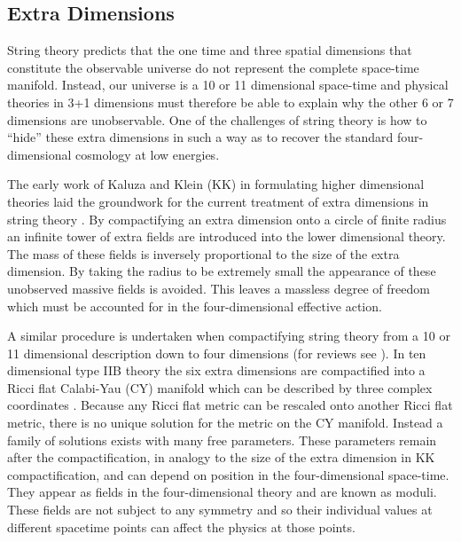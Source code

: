\subsection{Extra Dimensions}
String theory predicts that the one time and three spatial dimensions that
constitute the observable universe do not represent the complete space-time manifold.
Instead,
our universe is a 10 or
11 dimensional space-time and physical theories in 3+1 dimensions must
therefore be able to explain why the 
other 6 or 7 dimensions are unobservable. One of the challenges of string
theory is how 
to ``hide'' these extra dimensions in such a way as to 
recover the standard four-dimensional cosmology at low energies.

The early work of Kaluza and Klein (KK) in formulating higher dimensional 
theories laid the groundwork for the current treatment of extra dimensions in
string theory \cite{Kaluza1921, Klein1926}. By
compactifying an extra dimension onto a circle of finite radius an infinite
tower of extra fields are introduced into the lower dimensional theory. The
mass of these fields is inversely proportional to the size of the extra
dimension. By taking the radius to be extremely small the appearance of these
unobserved massive fields is avoided. This leaves a
massless degree of freedom which must be accounted for in the four-dimensional
effective action. 


A similar procedure is undertaken when compactifying string theory from a
10 or 11 dimensional description down to four dimensions (for reviews see
\cite{douglas,grana}).
In ten dimensional type IIB theory the six extra dimensions are
compactified into a Ricci flat Calabi-Yau (CY) manifold which can be described
by three complex coordinates \cite{Yau1977}. 
Because any Ricci flat metric can be
rescaled onto another Ricci flat metric, there is no unique solution for the
metric on the CY manifold. Instead a family of solutions exists with many free
parameters. These parameters remain after the compactification, in
analogy to the size of the extra dimension in KK compactification, and can depend
on position in the four-dimensional space-time. They appear as fields
in the four-dimensional theory and are known as moduli. 
These fields are not subject to any symmetry and so their individual values
at different spacetime points can affect the physics at those points.





